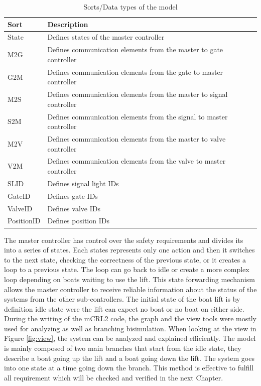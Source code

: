 \begin{table}[htbp]
	\centering
	\begin{tabular}{lp{10.5cm}l}
		\toprule
		\textbf{Sort} &  \textbf{Description} \\
		\hline
		State&  Defines states of the master controller \\
		M2G &  Defines communication elements from the master to gate controller\\
		G2M & Defines communication elements from the gate to master controller \\
		M2S &  Defines communication elements from the master to signal controller\\
		S2M &  Defines communication elements from the signal to master controller\\
		M2V &  Defines communication elements from the master to valve controller\\
		V2M &  Defines communication elements from the valve to master controller\\
		SLID &  Defines signal light IDs\\
		GateID &  Defines gate IDs\\
		ValveID &  Defines valve IDs\\
		PositionID   & Defines position IDs\\
		\bottomrule
	\end{tabular}%
		\caption{Sorts/Data types of the model}
	\label{tab:sors}%
\end{table}%
The master controller has control over the safety requirements and divides its into a series of states. Each states represents only one action and then it switches to the next state, checking the correctness of the previous state, or it creates a loop to a previous state. The loop can go back to idle or create a more complex loop depending on boats waiting to use the lift. This state forwarding mechanism allows the master controller to receive reliable information about the status of the systems from the other sub-controllers. The initial state of the boat lift is by definition idle state were the lift can expect no boat or no boat on either side.\\
During the writing of the mCRL2 code, the graph and the view tools were mostly used for analyzing as well as branching bisimulation. When looking at the view in Figure \ref{fig:view}, the system can be analyzed and explained efficiently. The model is mainly composed of two main branches that start from the idle state, they describe a boat going up the lift and a boat going down the lift. The system goes into one state at a time going down the branch. This method is effective to fulfill all requirement which will be checked and verified in the next Chapter. 

